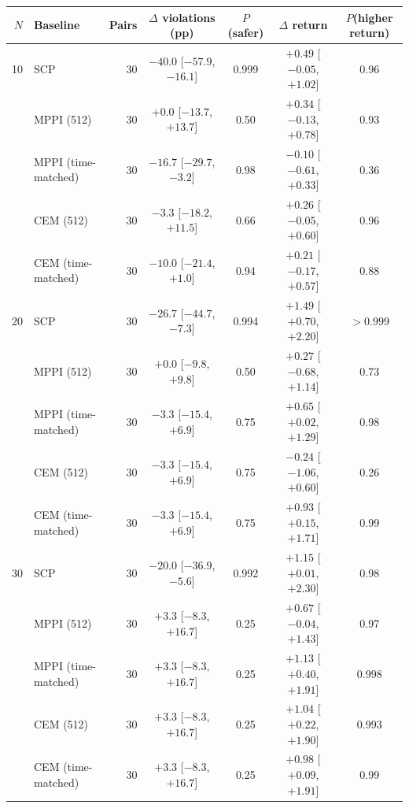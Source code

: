 \begin{tabular}{@{}rlrcccc@{}}
\toprule
$N$ & Baseline & Pairs & $\Delta$ violations (pp) & $P$(safer) & $\Delta$ return & $P$(higher return) \\
\midrule
10 & SCP & 30 & $-40.0$ [$-57.9$, $-16.1$] & 0.999 & $+0.49$ [$-0.05$, $+1.02$] & 0.96 \\
 & MPPI (512) & 30 & $+0.0$ [$-13.7$, $+13.7$] & 0.50 & $+0.34$ [$-0.13$, $+0.78$] & 0.93 \\
 & MPPI (time-matched) & 30 & $-16.7$ [$-29.7$, $-3.2$] & 0.98 & $-0.10$ [$-0.61$, $+0.33$] & 0.36 \\
 & CEM (512) & 30 & $-3.3$ [$-18.2$, $+11.5$] & 0.66 & $+0.26$ [$-0.05$, $+0.60$] & 0.96 \\
 & CEM (time-matched) & 30 & $-10.0$ [$-21.4$, $+1.0$] & 0.94 & $+0.21$ [$-0.17$, $+0.57$] & 0.88 \\
\midrule
20 & SCP & 30 & $-26.7$ [$-44.7$, $-7.3$] & 0.994 & $+1.49$ [$+0.70$, $+2.20$] & $>0.999$ \\
 & MPPI (512) & 30 & $+0.0$ [$-9.8$, $+9.8$] & 0.50 & $+0.27$ [$-0.68$, $+1.14$] & 0.73 \\
 & MPPI (time-matched) & 30 & $-3.3$ [$-15.4$, $+6.9$] & 0.75 & $+0.65$ [$+0.02$, $+1.29$] & 0.98 \\
 & CEM (512) & 30 & $-3.3$ [$-15.4$, $+6.9$] & 0.75 & $-0.24$ [$-1.06$, $+0.60$] & 0.26 \\
 & CEM (time-matched) & 30 & $-3.3$ [$-15.4$, $+6.9$] & 0.75 & $+0.93$ [$+0.15$, $+1.71$] & 0.99 \\
\midrule
30 & SCP & 30 & $-20.0$ [$-36.9$, $-5.6$] & 0.992 & $+1.15$ [$+0.01$, $+2.30$] & 0.98 \\
 & MPPI (512) & 30 & $+3.3$ [$-8.3$, $+16.7$] & 0.25 & $+0.67$ [$-0.04$, $+1.43$] & 0.97 \\
 & MPPI (time-matched) & 30 & $+3.3$ [$-8.3$, $+16.7$] & 0.25 & $+1.13$ [$+0.40$, $+1.91$] & 0.998 \\
 & CEM (512) & 30 & $+3.3$ [$-8.3$, $+16.7$] & 0.25 & $+1.04$ [$+0.22$, $+1.90$] & 0.993 \\
 & CEM (time-matched) & 30 & $+3.3$ [$-8.3$, $+16.7$] & 0.25 & $+0.98$ [$+0.09$, $+1.91$] & 0.99 \\
\bottomrule
\end{tabular}
